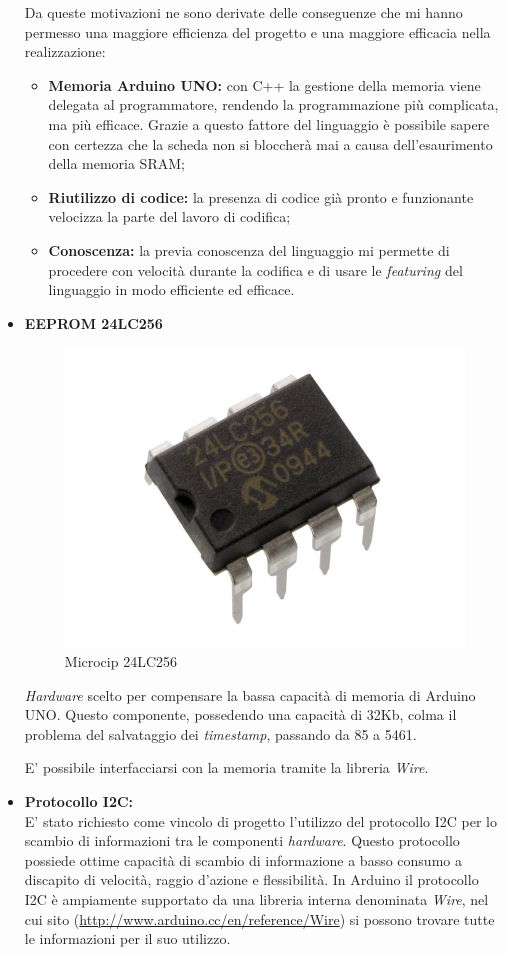 \begin{itemize}
Da queste motivazioni ne sono derivate delle conseguenze che mi hanno permesso una maggiore efficienza del progetto e una maggiore efficacia nella realizzazione:
\begin{itemize}
	\item \textbf{Memoria Arduino UNO:} con C++ la gestione della memoria viene delegata al programmatore, rendendo la programmazione più complicata, ma più efficace. Grazie a questo fattore del linguaggio è possibile sapere con certezza che la scheda non si bloccherà mai a causa dell'esaurimento della memoria SRAM;
	\item \textbf{Riutilizzo di codice:} la presenza di codice già pronto e funzionante velocizza la parte del lavoro di codifica;
	\item \textbf{Conoscenza:} la previa conoscenza del linguaggio mi permette di procedere con velocità durante la codifica e di usare le \textit{featuring} del linguaggio in modo efficiente ed efficace.
\end{itemize}   

\newpage

\item \textbf{EEPROM 24LC256}\\

\begin{figure}[htbp]
\centering
\includegraphics[width=.25\textwidth]{./capitoli/capitolo3/img/micro}
\caption{Microcip 24LC256}
\end{figure}

\textit{Hardware} scelto per compensare la bassa capacità di memoria di Arduino UNO. Questo componente, possedendo una capacità di 32Kb, colma il problema del salvataggio dei \textit{timestamp}, passando da 85 a 5461. 

E' possibile interfacciarsi con la memoria tramite la libreria \textit{Wire}.

\item \textbf{Protocollo I2C:}\\
E' stato richiesto come vincolo di progetto l'utilizzo del protocollo I2C per lo scambio di informazioni tra le componenti \textit{hardware}. Questo protocollo possiede ottime capacità di scambio di informazione a basso consumo a discapito di velocità, raggio d'azione e flessibilità. In Arduino il protocollo I2C è ampiamente supportato da una libreria interna denominata \textit{Wire}, nel cui sito (\url{http://www.arduino.cc/en/reference/Wire}) si possono trovare tutte le informazioni per il suo utilizzo.


\end{itemize}
